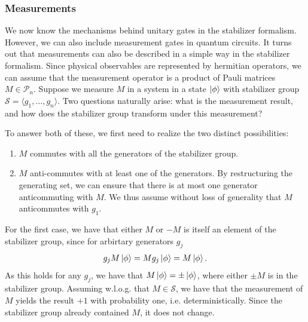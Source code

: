 \subsubsection{Measurements}

We now know the mechanisms behind unitary gates in the stabilizer formalism.
However, we can also include measurement gates in quantum circuits. It turns
out that measurements can also be described in a simple way in the stabilizer
formalism. Since physical observables are represented by hermitian operators,
we can assume that the measurement operator is a product of Pauli matrices $M
\in\mathcal{P}_n$. Suppose we measure $M$ in a system in a state $\ket{\phi}$
with stabilizer group $\mathcal{S} = \langle g_1, \ldots, g_n\rangle$. Two
questions naturally arise: what is the measurement result, and how does the
stabilizer group transform under this measurement?

To answer both of these, we first need to realize the two distinct
possibilities:
\begin{enumerate}
  \item $M$ commutes with all the generators of the stabilizer group.
  \item $M$ anti-commutes with at least one of the generators. By restructuring
    the generating set, we can ensure that there is at most one generator
    anticommuting with $M$. We thus assume without loss of generality that $M$
    anticommutes with $g_1$.
\end{enumerate}

For the first case, we have that either $M$ or $-M$ is itself an element of the
stabilizer group, since for arbirtary generators $g_j$
\begin{align}
  g_j M \ket{\phi} = M g_j \ket{\phi} = M\ket{\phi}
.\end{align}
As this holds for any $g_j$, we have that $M\ket{\phi}=\pm \ket{\phi}$, where
either $\pm M$ is in the stabilizer group. Assuming w.l.o.g. that
$M\in\mathcal{S}$, we have that the measurement of $M$ yields the result $+1$
with probability one, i.e. deterministically. Since the stabilizer group
already contained $M$, it does not change. 


